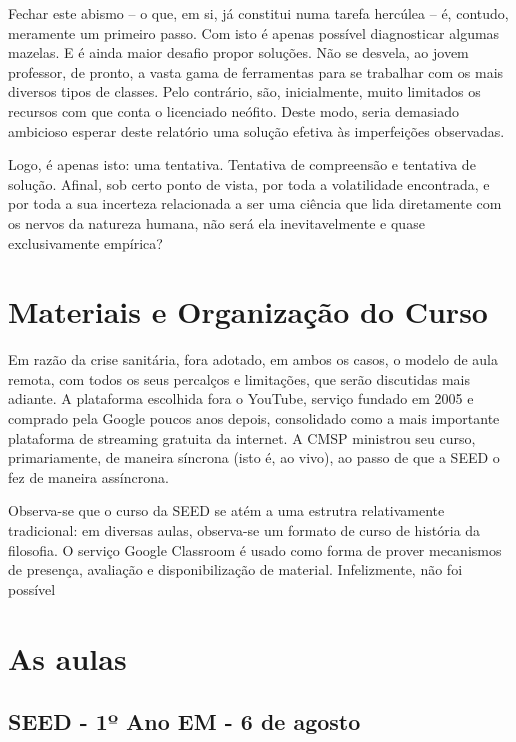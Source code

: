 \documentclass[12pt,a4paper]{article}
\begin{document}
	Fechar este abismo -- o que, em si, já constitui numa tarefa hercúlea --
	é, contudo, meramente um primeiro passo. Com isto é 
	apenas possível diagnosticar algumas mazelas. E é ainda maior desafio 
	propor soluções. Não se desvela, ao jovem professor, de pronto, 
	a vasta gama de ferramentas para se trabalhar com os mais diversos 
	tipos de classes. Pelo contrário, são, inicialmente, muito limitados 
	os recursos com que conta o licenciado neófito. Deste modo, seria 
	demasiado ambicioso esperar deste relatório uma solução efetiva 
	às imperfeições observadas. 

	Logo, é apenas isto: uma tentativa. Tentativa de compreensão e 
	tentativa de solução. Afinal, sob certo ponto de vista, por toda a 
	volatilidade encontrada, e por toda a sua incerteza relacionada a 
	ser uma ciência que lida diretamente com os nervos da natureza 
	humana, não será ela inevitavelmente e quase exclusivamente empírica? 
	
	\newpage
	
	\section{Materiais e Organização do Curso}

	Em razão da crise sanitária, fora adotado, em ambos os casos, o 
	modelo de aula remota, com todos os seus percalços e limitações, 
	que serão discutidas mais adiante. A plataforma escolhida fora o 
	YouTube, serviço fundado em 2005 e comprado pela Google poucos 
	anos depois, consolidado como a mais importante plataforma de 
	streaming gratuita da internet. A CMSP ministrou seu curso, 
	primariamente, de maneira síncrona (isto é, ao vivo), ao passo de 
	que a SEED o fez de maneira assíncrona. 

	Observa-se que o curso da SEED se atém a uma estrutra relativamente 
	tradicional: em diversas aulas, observa-se um formato de curso de 
	história da filosofia. O serviço Google Classroom é usado como forma 
	de prover mecanismos de presença, avaliação e disponibilização de 
	material. Infelizmente, não foi possível
		

    	
	\newpage
	
	\section{As aulas}

	\subsection{SEED - 1º Ano EM - 6 de agosto}
\end{document}
